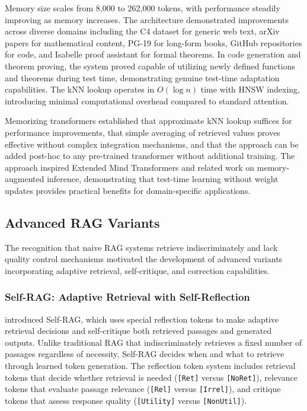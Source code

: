 \documentclass[11pt,letterpaper]{article}
\begin{document}
Memory size scales from 8,000 to 262,000 tokens, with performance steadily improving as memory increases. The architecture demonstrated improvements across diverse domains including the C4 dataset for generic web text, arXiv papers for mathematical content, PG-19 for long-form books, GitHub repositories for code, and Isabelle proof assistant for formal theorems. In code generation and theorem proving, the system proved capable of utilizing newly defined functions and theorems during test time, demonstrating genuine test-time adaptation capabilities. The kNN lookup operates in $O(\log n)$ time with HNSW indexing, introducing minimal computational overhead compared to standard attention.

Memorizing transformers established that approximate kNN lookup suffices for performance improvements, that simple averaging of retrieved values proves effective without complex integration mechanisms, and that the approach can be added post-hoc to any pre-trained transformer without additional training. The approach inspired Extended Mind Transformers and related work on memory-augmented inference, demonstrating that test-time learning without weight updates provides practical benefits for domain-specific applications.

\subsection{Advanced RAG Variants}

The recognition that naive RAG systems retrieve indiscriminately and lack quality control mechanisms motivated the development of advanced variants incorporating adaptive retrieval, self-critique, and correction capabilities.

\subsubsection{Self-RAG: Adaptive Retrieval with Self-Reflection}

\cite{asai2024selfrag} introduced Self-RAG, which uses special reflection tokens to make adaptive retrieval decisions and self-critique both retrieved passages and generated outputs. Unlike traditional RAG that indiscriminately retrieves a fixed number of passages regardless of necessity, Self-RAG decides when and what to retrieve through learned token generation. The reflection token system includes retrieval tokens that decide whether retrieval is needed ({\tt [Ret]} versus {\tt [NoRet]}), relevance tokens that evaluate passage relevance ({\tt [Rel]} versus {\tt [Irrel]}), and critique tokens that assess response quality ({\tt [Utility]} versus {\tt [NonUtil]}).
\end{document}
